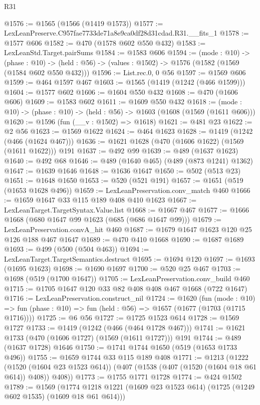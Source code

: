 \begin{lexlean}{R31}
\begin{coremodule}
@1576 := @1565 (@1566 (@1419 @1573))
@1577 := LexLeanPreserve.C957fae7733de71a8e9ca0df28d31cdad.R31.__fits_1
@1578 := @1577 @606
@1582 := @470 (@1578 @602 @550 @432)
@1583 := LexLeanStd.Target.pairSums
@1584 := @1583 @606
@1594 := (mode : @10) ->
  (phase : @10) -> (held : @56) -> (values : @1502) -> @1576 (@1582 (@1569 (@1584 @602 @550 @432)))
@1596 := List.rec.{0, 0} @56
@1597 := @1569 @606
@1599 := @464 @1597 @467
@1603 := @1565 (@1419 (@1242 (@466 @1599)))
@1604 := @1577 @602
@1606 := @1604 @550 @432
@1608 := @470 (@1606 @606)
@1609 := @1583 @602
@1611 := @1609 @550 @432
@1618 := (mode : @10) -> (phase : @10) -> (held : @56) -> @1603 (@1608 (@1569 (@1611 @606)))
@1620 := @1596 (fun (__v : @1502) => @1618)
@1621 := @481 @23
@1622 := @2 @56
@1623 := @1569 @1622
@1624 := @464 @1623
@1628 := @1419 (@1242 (@466 (@1624 @467)))
@1636 := @1621 @1628 (@470 (@1606 @1622) (@1569 (@1611 @1622))) @191
@1637 := @492 @99
@1639 := @489 (@1637 @1623)
@1640 := @492 @68
@1646 := @489 (@1640 @465) (@489 (@873 @1241) @1362)
@1647 := @1639 @1646
@1648 := @1636 @1647
@1650 := @502 (@513 @23)
@1651 := @1648 @1650
@1653 := @520 (@521 @191)
@1657 := @1651 (@519 (@1653 @1628 @496))
@1659 := LexLeanPreservation.conv_match @460
@1666 := @1659 @1647 @33 @115 @189 @408 @410 @1623
@1667 := LexLeanTarget.TargetSyntax.Value.list
@1668 := @1667 @467
@1677 := @1666 @1668 (@680 @1647 @99 @1623 (@685 (@686 @1647 @99)))
@1679 := LexLeanPreservation.convA_hit @460
@1687 := @1679 @1647 @1623 @120 @25 @126 @188 @467 @1647
@1689 := @470 @410 @1668
@1690 := @1687 @1689
@1693 := @499 (@500 (@504 @463))
@1694 := LexLeanTarget.TargetSemantics.destruct
@1695 := @1694 @120
@1697 := @1693 (@1695 @1623)
@1698 := @1690 @1697
@1700 := @520 @25 @467
@1703 := @1698 (@519 (@1700 @1647))
@1705 := LexLeanPreservation.conv_build @460
@1715 := @1705 @1647 @120 @33 @82 @408 @408 @467 @1668 (@722 @1647)
@1716 := LexLeanPreservation.construct_nil
@1724 := @1620
    (fun (mode : @10) =>
    fun (phase : @10) => fun (held : @56) => @1657 (@1677 (@1703 (@1715 @1716))))
@1725 := @6 @56
@1727 := @1725 @1523 @614
@1728 := @1569 @1727
@1733 := @1419 (@1242 (@466 (@464 @1728 @467)))
@1741 := @1621 @1733 (@470 (@1606 @1727) (@1569 (@1611 @1727))) @191
@1744 := @489 (@1637 @1728) @1646
@1750 := @1741 @1744 @1650 (@519 (@1653 @1733 @496))
@1755 := @1659 @1744 @33 @115 @189 @408
@1771 := @1213
    (@1222
      (@1520 (@1604 @23 @1523 @614))
      (@407 (@1538 (@407 (@1520 (@1604 @18 @61 @614)) @408)) @408))
@1773 := @1755 @1771 @1728
@1774 := @424 @1502
@1789 := @1569
    (@1774 @1218 @1221 (@1609 @23 @1523 @614) (@1725 (@1249 @602 @1535) (@1609 @18 @61 @614)))

\end{coremodule}
\end{lexlean}
